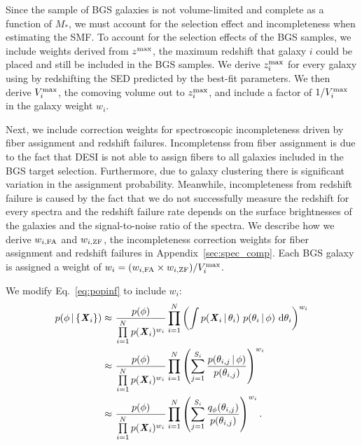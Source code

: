 Since the sample of BGS galaxies is not volume-limited and complete as a
function of $M_*$, we must account for the selection effect and incompleteness
when estimating the SMF. 
To account for the selection effects of the BGS samples, we include weights
derived from $z^{\rm max}$, the maximum redshift that galaxy $i$ could be
placed and still be included in the BGS samples. 
We derive $z^{\rm max}_i$ for every galaxy using by redshifting the SED
predicted by the best-fit parameters. 
We then derive $V^{\rm max}_i$, the comoving volume out to $z^{\rm max}_i$, and
include a factor of $1/V^{\rm max}_i$ in the galaxy weight $w_i$. 

Next, we include correction weights for spectroscopic incompleteness driven by
fiber assignment and redshift failures. 
Incompletenss from fiber assignment is due to the fact that DESI is not able to
assign fibers to all galaxies included in the BGS target selection. 
Furthermore, due to galaxy clustering there is significant variation in the
assignment probability. 
Meanwhile, incompleteness from redshift failure is caused by the fact that we
do not successfully measure the redshift for every spectra and the redshift
failure rate depends on the surface brightnesses of the galaxies and the
signal-to-noise ratio of the spectra. 
We describe how we derive $w_{i, {\rm FA}}$ and $w_{i, {\rm ZF}}$, the
incompleteness correction weights for fiber assignment and redshift failures in
Appendix~\ref{sec:spec_comp}. 
Each BGS galaxy is assigned a weight of 
$w_i = (w_{i, {\rm FA}}\times w_{i, {\rm ZF}})/V^{\rm max}_i$.

We modify Eq.~\ref{eq:popinf} to include $w_i$: 
\begin{align}
p(\phi \,|\, \{{\textbf{\textit{X}}_i}\}) 
    \approx&~\frac{p(\phi)}{\prod\limits_{i=1}^N p({\textbf{\textit{X}}_i})^{w_i}} 
    \prod\limits_{i=1}^N \left(\int p({\textbf{\textit{X}}_i} \,|\, \theta_i)~p(\theta_i \,|\, \phi)~{\rm d}\theta_i \right)^{w_i} \\ 
    \approx&~\frac{p(\phi)}{\prod\limits_{i=1}^N p({\textbf{\textit{X}}_i})^{w_i}} 
    \prod\limits_{i=1}^N \left( \sum\limits_{j=1}^{S_i}
    \frac{p(\theta_{i,j} \,|\, \phi)}{p(\theta_{i,j})} \right)^{w_i} \\
    \approx&~\frac{p(\phi)}{\prod\limits_{i=1}^N p({\textbf{\textit{X}}_i})^{w_i}} 
    \prod\limits_{i=1}^N \left( \sum\limits_{j=1}^{S_i}
    \frac{q_\phi(\theta_{i,j})}{p(\theta_{i,j})} \right)^{w_i}.
\end{align} 

